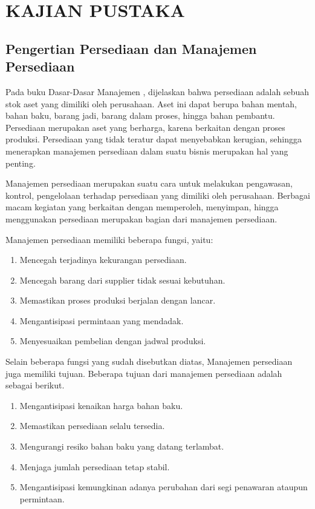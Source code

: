 
\chapter{KAJIAN PUSTAKA} 

\begin{spacing}{1.5}
	
\section{Pengertian Persediaan dan Manajemen Persediaan}

Pada buku Dasar-Dasar Manajemen \citep{dasarmanajemen}, dijelaskan bahwa persediaan adalah sebuah stok aset yang dimiliki oleh perusahaan. Aset ini dapat berupa bahan mentah, bahan baku, barang jadi, barang dalam proses, hingga bahan pembantu. Persediaan merupakan aset yang berharga, karena berkaitan dengan proses produksi. Persediaan yang tidak teratur dapat menyebabkan kerugian, sehingga menerapkan manajemen persediaan dalam suatu bisnis merupakan hal yang penting. 

Manajemen persediaan merupakan suatu cara untuk melakukan pengawasan, kontrol, pengelolaan terhadap persediaan yang dimiliki oleh perusahaan. Berbagai macam kegiatan yang berkaitan dengan memperoleh, menyimpan, hingga menggunakan persediaan merupakan bagian dari manajemen persediaan.

Manajemen persediaan memiliki beberapa fungsi, yaitu:
\begin{enumerate}
	\item Mencegah terjadinya kekurangan persediaan.
	\item Mencegah barang dari supplier tidak sesuai kebutuhan.
	\item Memastikan proses produksi berjalan dengan lancar.
	\item Mengantisipasi permintaan yang mendadak.
	\item Menyesuaikan pembelian dengan jadwal produksi.
\end{enumerate}

Selain beberapa fungsi yang sudah disebutkan diatas, Manajemen persediaan juga memiliki tujuan. Beberapa tujuan dari manajemen persediaan adalah sebagai berikut.
\begin{enumerate}
	\item Mengantisipasi kenaikan harga bahan baku.
	\item Memastikan persediaan selalu tersedia.
	\item Mengurangi resiko bahan baku yang datang terlambat.
	\item Menjaga jumlah persediaan tetap stabil.
	\item Mengantisipasi kemungkinan adanya perubahan dari segi penawaran ataupun permintaan.
\end{enumerate}


\end{spacing}
